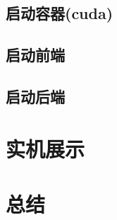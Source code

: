 \documentclass[UTF8]{ctexart}
\begin{document}
\subsection{启动容器(cuda)}

\subsection{启动前端}

\subsection{启动后端}

\section{实机展示}

\section{总结}
\end{document}
